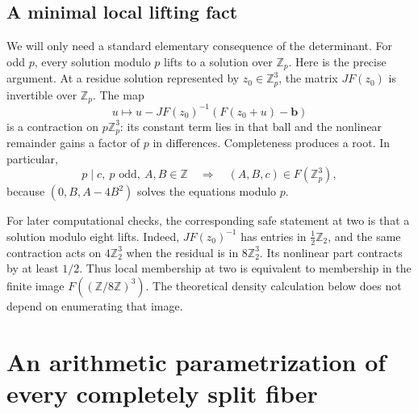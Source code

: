 \documentclass[11pt]{article}
\numberwithin{equation}{section}
\theoremstyle{plain}
\theoremstyle{plain}
\theoremstyle{plain}
\theoremstyle{definition}
\theoremstyle{definition}
\theoremstyle{definition}
\theoremstyle{remark}
\newcommand{\Z}{\mathbb Z}\newcommand{\Q}{\mathbb Q}
\newcommand{\target}{\boldsymbol b}
\begin{document}
\subsection{A minimal local lifting fact}
We will only need a standard elementary consequence of the determinant.
For odd $p$, every solution modulo $p$ lifts to a solution over $\Z_p$.
Here is the precise argument. At a residue solution represented by
$z_0\in\Z_p^3$, the matrix $JF(z_0)$ is invertible over $\Z_p$. The map
\[
 u\longmapsto u-JF(z_0)^{-1}(F(z_0+u)-\target)
\]
is a contraction on $p\Z_p^3$: its constant term lies in that ball and
the nonlinear remainder gains a factor of $p$ in differences. Completeness
produces a root. In particular,
\begin{equation}\label{alg:dh:eq:pdivc}
 p\mid c,\ p\text{ odd},\ A,B\in\Z
 \quad\Longrightarrow\quad (A,B,c)\in F(\Z_p^3),
\end{equation}
because $(0,B,A-4B^2)$ solves the equations modulo $p$.

For later computational checks, the corresponding safe statement at two
is that a solution modulo eight lifts. Indeed, $JF(z_0)^{-1}$ has entries
in $\frac12\Z_2$, and the same contraction acts on $4\Z_2^3$ when the
residual is in $8\Z_2^3$. Its nonlinear part contracts by at least $1/2$.
Thus local membership at two is equivalent to membership in the finite
image $F((\Z/8\Z)^3)$. The theoretical density calculation below does
not depend on enumerating that image.

\section{An arithmetic parametrization of every completely split fiber}\label{alg:dh:sec:param}
\end{document}
